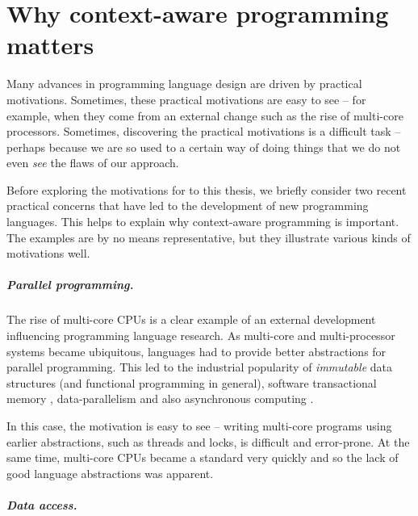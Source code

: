 

\chapter{Why context-aware programming matters}
\label{ch:intro}

Many advances in programming language design are driven by practical motivations. Sometimes,
these practical motivations are easy to see -- for example, when they come from an external change
such as the rise of multi-core processors. Sometimes, discovering the practical motivations is a
difficult task -- perhaps because we are so used to a certain way of doing things that we do not
even \emph{see} the flaws of our approach.

Before exploring the motivations for to this thesis, we briefly consider two recent practical
concerns that have led to the development of new programming languages. This helps to explain why
context-aware programming is important. The examples are by no means representative, but they
illustrate various kinds of motivations well.

\paragraph{Parallel programming.}

The rise of multi-core CPUs is a clear example of an external development influencing
programming language research. As multi-core and multi-processor systems became ubiquitous,
languages had to provide better abstractions for parallel programming. This led to the industrial
popularity of \emph{immutable} data structures (and functional programming in general), software
transactional memory \cite{app-haskell-stm}, data-parallelism and also asynchronous
computing \cite{app-fsharp-async}.

In this case, the motivation is easy to see -- writing multi-core programs using earlier
abstractions, such as threads and locks, is difficult and error-prone. At the same time,
multi-core CPUs became a standard very quickly and so the lack of good language abstractions
was apparent.

\paragraph{Data access.}

